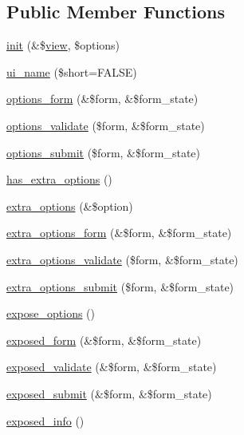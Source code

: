 \subsection*{Public Member Functions}
\begin{CompactItemize}
\item 
\hyperlink{classviews__handler_1f5f42ba46d3584280788fda97eee8c5}{init} (\&\$\hyperlink{classview}{view}, \$options)
\item 
\hyperlink{classviews__handler_e81019ed08d9c3f5bca3d16c69e7b39f}{ui\_\-name} (\$short=FALSE)
\item 
\hyperlink{classviews__handler_a41fcf16b177eb03e35facbae6320f74}{options\_\-form} (\&\$form, \&\$form\_\-state)
\item 
\hyperlink{classviews__handler_48a7b56e8952d9fcf56e2dec7794bb4e}{options\_\-validate} (\$form, \&\$form\_\-state)
\item 
\hyperlink{classviews__handler_583187975f1bbf5df13138a0898f2ac7}{options\_\-submit} (\$form, \&\$form\_\-state)
\item 
\hyperlink{classviews__handler_10d35469346efc352d21e5f44de60b2e}{has\_\-extra\_\-options} ()
\item 
\hyperlink{classviews__handler_0299b8b2ba70379a5aca4ddb5b8d95b4}{extra\_\-options} (\&\$option)
\item 
\hyperlink{classviews__handler_0eed1d12c47d60190f59e135d962719e}{extra\_\-options\_\-form} (\&\$form, \&\$form\_\-state)
\item 
\hyperlink{classviews__handler_8a2c2fb295ec8024fc9e33361a92e8ac}{extra\_\-options\_\-validate} (\$form, \&\$form\_\-state)
\item 
\hyperlink{classviews__handler_ca642bf4dff25e0d49f7fca65bb97f77}{extra\_\-options\_\-submit} (\$form, \&\$form\_\-state)
\item 
\hyperlink{classviews__handler_2db9f3127a5364b17fb775cede2f43a6}{expose\_\-options} ()
\item 
\hyperlink{classviews__handler_657fbb873c6be9e1da904e2aad191f66}{exposed\_\-form} (\&\$form, \&\$form\_\-state)
\item 
\hyperlink{classviews__handler_2dd536754e4764cc82ffe7c864f54b16}{exposed\_\-validate} (\&\$form, \&\$form\_\-state)
\item 
\hyperlink{classviews__handler_6b0a97cfe77b3f9dfcfad08f21f5c0f7}{exposed\_\-submit} (\&\$form, \&\$form\_\-state)
\item 
\hyperlink{classviews__handler_2f16176116ecd86a8f8c60a2bc1ebd54}{exposed\_\-info} ()
\item 

\end{CompactItemize}
